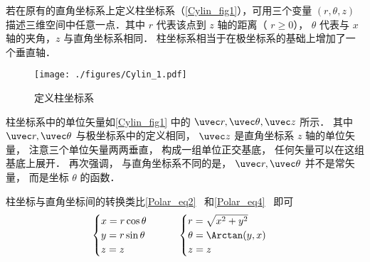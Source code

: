 
若在原有的直角坐标系上定义柱坐标系（\autoref{Cylin_fig1}），可用三个变量 $(r, \theta, z)$ 描述三维空间中任意一点．其中 $r$ 代表该点到 $z$ 轴的距离（ $r \geqslant 0$）， $\theta$ 代表与 $x$ 轴的夹角，$z$ 与直角坐标系相同． 柱坐标系相当于在极坐标系的基础上增加了一个垂直轴．

\begin{figure}[ht]
\centering
\texttt{[image: ./figures/Cylin\_1.pdf]}
\caption{定义柱坐标系}\label{Cylin_fig1}
\end{figure}

柱坐标系中的单位矢量如\autoref{Cylin_fig1} 中的 $\uvec r,\uvec \theta ,\uvec z$ 所示． 其中 $\uvec r, \uvec \theta$ 与极坐标系中的定义相同， $\uvec z$ 是直角坐标系 $z$ 轴的单位矢量， 注意三个单位矢量两两垂直， 构成一组单位正交基底， 任何矢量可以在这组基底上展开． 再次强调， 与直角坐标系不同的是， $\uvec r, \uvec \theta$ 并不是常矢量， 而是坐标 $\theta$ 的函数．

柱坐标与直角坐标间的转换类比\autoref{Polar_eq2}~ 和\autoref{Polar_eq4}~ 即可
\begin{equation}
\begin{cases}
x = r\cos \theta \\
y = r\sin \theta \\
z = z
\end{cases}
\qquad
\begin{cases}
r = \sqrt {x^2 + y^2} \\
\theta  = \Arctan(y, x)\\
z = z
\end{cases}
\end{equation}